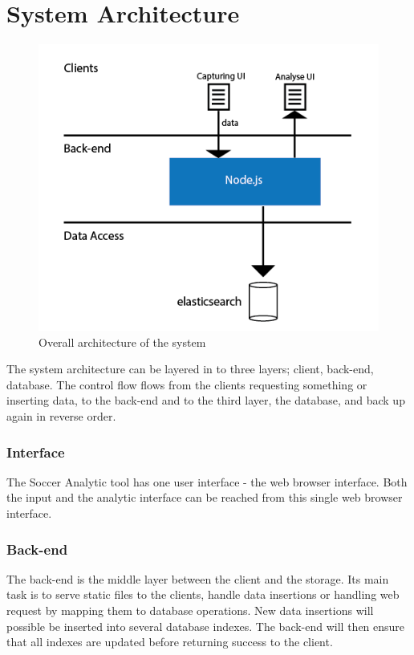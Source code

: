 

\section{System Architecture}

\begin{figure}[ht!]
\centering
\includegraphics[width=1\textwidth]{images/general/arhitecture.png}
\caption{Overall architecture of the system }
\label{overflow}
\end{figure}

The system architecture can be layered in to three layers; client, back-end, database. The control flow flows from the clients requesting something or inserting data, to the back-end and to the third layer, the database, and back up again in reverse order. 

\subsubsection{Interface}

The Soccer Analytic tool has one user interface - the web browser interface. Both the input and the analytic interface can be reached from this single web browser interface.

\subsubsection{Back-end}

The back-end is the middle layer between the client and the storage. Its main task is to serve static files to the clients, handle data insertions or handling web request by mapping them to database operations. New data insertions will possible be inserted into several database indexes. The back-end will then ensure that all indexes are updated before returning success to the client.

